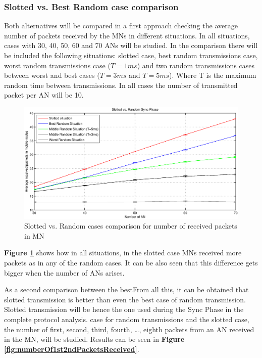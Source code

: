 \subsubsection{Slotted vs. Best Random case comparison}

Both alternatives will be compared in a first approach checking the average number of packets received by the \acp{MN} in different situations. In 
all situations, cases with 30, 40, 50, 60 and 70 \acp{AN} will be studied. In the comparison there will be included the following situations: 
slotted case, best random transmissions case, worst random transmissions case ($T=1 ms$) and two random transmissions cases between worst and best cases
($T=3ms$ and $T=5ms$). Where T is the maximum random time between transmissions. In all cases the number of transmitted packet per \ac{AN} will be 10.

\begin{figure}[ht]
 \begin{center}
  \includegraphics[width=1\textwidth]{slottedVsRandomAverageReceivedPackets.eps}
 \end{center}
 \caption{Slotted vs. Random cases comparison for number of received packets in \ac{MN}}
 \label{fig:slottedVsRandomAverageReceivedPackets}
\end{figure}

\textbf{Figure \ref{fig:slottedVsRandomAverageReceivedPackets}} shows how in all situations, in the slotted case \acp{MN} received more packets as in
any of the random cases. It can be also seen that this difference gets bigger when the number of \acp{AN} arises.

As a second comparison between the bestFrom all this, it can be obtained that slotted transmission is better than even the best case of random transmission. Slotted transmission will be hence
the one used during the Sync Phase in the complete protocol analysis. case for random transmissions and the slotted case, the number of first, second, third, fourth, \ldots, eighth
packets from an \ac{AN} received in the \ac{MN}, will be studied. Results can be seen in \textbf{Figure \ref{fig:numberOf1st2ndPacketsReceived}}.

